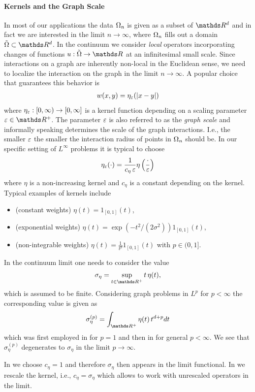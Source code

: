 \paragraph{Kernels and the Graph Scale} 
In most of our applications the data $\Omega_n$ is given as a subset of $\R^d$ and in fact we are interested in the limit $n\to\infty$, where $\Omega_n$ fills out a domain $\tilde\domain\subset\R^d$. In the continuum we consider \emph{local} operators incorporating changes of functions $u:\tilde\domain\to\R$ at an infinitesimal small scale. Since interactions on a graph are inherently non-local in the Euclidean sense, we need to localize the interaction on the graph in the limit $n\to\infty$. A popular choice that guarantees this behavior is
%
\begin{align*}
w(x,y) = \eta_{\varepsilon}(\left|x-y\right|)
\end{align*}
%
where $\eta_\varepsilon:[0,\infty)\to [0,\infty]$ is a kernel function depending on a scaling parameter $\gscale\in\R^+$. The parameter $\varepsilon$ is also referred to as the \emph{graph scale} and informally speaking determines the scale of the graph interactions. I.e., the smaller $\varepsilon$ the smaller the interaction radius of points in $\Omega_n$ should be. In our specific setting of $L^\infty$ problems it is typical to choose
%
\begin{align*}
\eta_\varepsilon(\cdot) = \frac{1}{c_\eta\, \varepsilon} \eta\left(\frac{\cdot}{\varepsilon}\right)
\end{align*}
%
where $\eta$ is a non-increasing kernel and $c_\eta$ is a constant depending on the kernel. Typical examples of kernels include
%
\begin{itemize}
\item (constant weights) $\eta(t)=1_{[0,1]}(t)$,
\item (exponential weights) $\eta(t)=\exp(-t^2/(2\sigma^2))1_{[0,1]}(t)$,
\item (non-integrable weights) $\eta(t)=\frac{1}{t^p}1_{[0,1]}(t)$ with $p\in(0,1]$.
\end{itemize}
%
%
\begin{remark}{}{}
In the continuum limit one needs to consider the value 
%
\begin{align*}
\sigma_\eta = \sup_{t\in\R^+} t\, \eta(t),
\end{align*}
%
which is assumed to be finite. Considering graph problems in $L^p$ for $p<\infty$
the corresponding value is given as
%
\begin{align}\label{eq:kernelconst}
\sigma_\eta^{(p)} = \int_{\R^+} \eta(t)\, t^{d+p} dt
\end{align}
%
which was first employed in \cite{GarcSlep15} for $p=1$ and then in \cite{slepcev2019analysis} for general $p<\infty$. We see that $\sigma_\eta^{(p)}$ degenerates to $\sigma_\eta$ in the limit $p\to\infty$.

In \cite{roith2022continuum} we choose $c_\eta=1$ and therefore $\sigma_\eta$ then appears in the limit functional. In \cite{bungert2021uniform} we rescale the kernel, i.e., $c_\eta = \sigma_\eta$ which allows to work with unrescaled operators in the limit. 
\end{remark}
